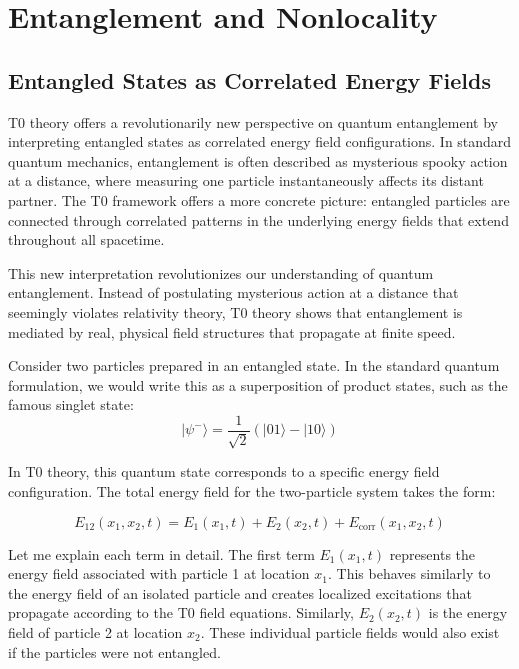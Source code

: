 \documentclass[12pt,a4paper]{article}
\theoremstyle{definition}
\theoremstyle{remark}
\begin{document}
\section{Entanglement and Nonlocality}

\subsection{Entangled States as Correlated Energy Fields}

T0 theory offers a revolutionarily new perspective on quantum entanglement by interpreting entangled states as correlated energy field configurations. In standard quantum mechanics, entanglement is often described as mysterious spooky action at a distance, where measuring one particle instantaneously affects its distant partner. The T0 framework offers a more concrete picture: entangled particles are connected through correlated patterns in the underlying energy fields that extend throughout all spacetime.

This new interpretation revolutionizes our understanding of quantum entanglement. Instead of postulating mysterious action at a distance that seemingly violates relativity theory, T0 theory shows that entanglement is mediated by real, physical field structures that propagate at finite speed.

Consider two particles prepared in an entangled state. In the standard quantum formulation, we would write this as a superposition of product states, such as the famous singlet state:
$$|\psi^-\rangle = \frac{1}{\sqrt{2}}(|01\rangle - |10\rangle)$$

In T0 theory, this quantum state corresponds to a specific energy field configuration. The total energy field for the two-particle system takes the form:

\begin{equation}
	E_{12}(x_1,x_2,t) = E_1(x_1,t) + E_2(x_2,t) + E_{\text{corr}}(x_1,x_2,t)
	\label{eq:entangled_energy}
\end{equation}

Let me explain each term in detail. The first term $E_1(x_1,t)$ represents the energy field associated with particle 1 at location $x_1$. This behaves similarly to the energy field of an isolated particle and creates localized excitations that propagate according to the T0 field equations. Similarly, $E_2(x_2,t)$ is the energy field of particle 2 at location $x_2$. These individual particle fields would also exist if the particles were not entangled.
\end{document}
